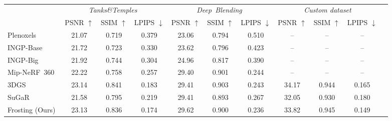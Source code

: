 \begin{table}
   \caption{
   }
  \label{tab:nvsmetrics_tandtdb}
  \centering
  {\scriptsize
  \begin{tabular}{@{}lcccccccccc@{}}
    \toprule
     \multicolumn{1}{c}{} & \multicolumn{3}{c}{\emph{Tanks\&Temples}~\cite{knapitsch-2017-tanksandtemples}} & \multicolumn{3}{c}{\emph{Deep~Blending}~\cite{hedman-2018-deepblending}} & \multicolumn{3}{c}{\emph{Custom dataset}} \\
     \cmidrule(r){2-4} \cmidrule(r){5-7} \cmidrule(r){8-10}
      & PSNR $\uparrow$ & SSIM $\uparrow$ & LPIPS $\downarrow$ & PSNR $\uparrow$ & SSIM $\uparrow$ & LPIPS $\downarrow$ & PSNR $\uparrow$ & SSIM $\uparrow$ & LPIPS $\downarrow$ & \\
    \midrule
    Plenoxels~\cite{yu_and_fridovichkeil2021plenoxels}  & 21.07 & 0.719 & 0.379 & 23.06 & 0.794 & 0.510 & -- & -- & -- &\\
    INGP-Base~\cite{mueller2022instantngp}  & 21.72 & 0.723 & 0.330 & 23.62 & 0.796 & 0.423 & -- & -- & -- & \\
    INGP-Big~\cite{mueller2022instantngp}  & 21.92 & 0.744 & 0.304 & 24.96 & 0.817 & 0.390 & -- & -- & -- & \\
    Mip-NeRF~360~\cite{barron2022mipnerf360}  & \cellcolor{yellow!25}22.22 & 0.758 & 0.257 & 29.40 & \cellcolor{orange!25}0.901 & \cellcolor{yellow!25}0.244 & -- & -- & -- & \\
    3DGS~\cite{kerbl3Dgaussians} & \cellcolor{red!25}23.14 & \cellcolor{red!25}0.841 & \cellcolor{orange!25}0.183 & \cellcolor{orange!25}29.41 & \cellcolor{red!25}0.903 & \cellcolor{orange!25}0.243 & \cellcolor{red!25}34.17 & \cellcolor{orange!25}0.944 & \cellcolor{orange!25}0.165 & \\
    \midrule
    SuGaR\cite{guedon2023sugar}  & 21.58 & \cellcolor{yellow!25}0.795 & \cellcolor{yellow!25}0.219 & \cellcolor{orange!25}29.41 & 0.893 & 0.267 & \cellcolor{yellow!25}32.05 & \cellcolor{yellow!25}0.930 & \cellcolor{yellow!25}0.180 & \\
    Frosting (Ours)  & \cellcolor{orange!25}23.13 & \cellcolor{orange!25}0.836 & \cellcolor{red!25}0.174 & \cellcolor{red!25}29.62 & \cellcolor{yellow!25}0.900 & \cellcolor{red!25}0.236 & \cellcolor{orange!25}33.82 & \cellcolor{red!25}0.945 & \cellcolor{red!25}0.149 & \\
    \bottomrule
  \end{tabular}
  }
\end{table}